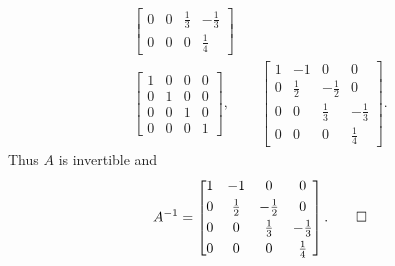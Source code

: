 \begin{solution}
\begin{align*}
\begin{bmatrix}
      0 & 0 & \frac13 & -\frac13 \\[3pt]
      0 & 0 & 0 & \frac14
    \end{bmatrix} \\
    \begin{bmatrix}
      1 & 0 & 0 & 0 \\[3pt]
      0 & 1 & 0 & 0 \\[3pt]
      0 & 0 & 1 & 0 \\[3pt]
      0 & 0 & 0 & 1
    \end{bmatrix},
    &\quad
    \begin{bmatrix}
      1 & -1 & 0 & 0 \\[3pt]
      0 & \frac12 & -\frac12 & 0 \\[3pt]
      0 & 0 & \frac13 & -\frac13 \\[3pt]
      0 & 0 & 0 & \frac14
    \end{bmatrix}.
  \end{align*}
  Thus $A$ is invertible and
  \begin{equation*}
    A^{-1} =
    \begin{bmatrix}
      1 & -1 & 0 & 0 \\[3pt]
      0 & \frac12 & -\frac12 & 0 \\[3pt]
      0 & 0 & \frac13 & -\frac13 \\[3pt]
      0 & 0 & 0 & \frac14
    \end{bmatrix}. \qedhere
  \end{equation*}
\end{solution}

